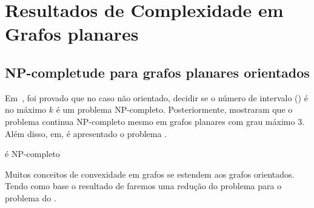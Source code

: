 \chapter{Resultados de Complexidade em Grafos planares}\label{6-complex}

\section{NP-completude para grafos planares orientados}

Em~\cite{CENTENO200911}, foi provado que no caso não orientado, decidir se o número de intervalo () é no máximo $k$ é um problema NP-completo. Posteriormente,\cite{PENSO201583} mostraram que o problema continua NP-completo mesmo em grafos planares com grau máximo 3. Além disso, em\cite{PENSO201583}, é apresentado o problema \sam.

\vspace{5pt}


\begin{theorem}
    \sam é NP-completo
\end{theorem}

Muitos conceitos de convexidade em grafos se estendem aos grafos orientados. Tendo como base o resultado de \cite{PENSO201583} faremos uma redução do problema \sam para o problema do \ind.


